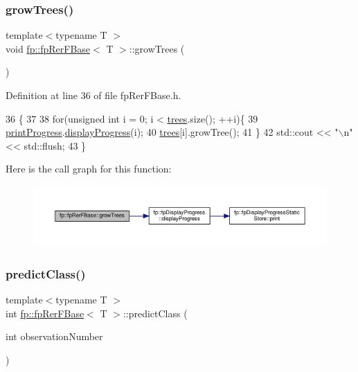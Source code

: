 \subsubsection{\texorpdfstring{grow\+Trees()}{growTrees()}}
{\footnotesize\ttfamily template$<$typename T $>$ \\
void \hyperlink{classfp_1_1fpRerFBase}{fp\+::fp\+Rer\+F\+Base}$<$ T $>$\+::grow\+Trees (\begin{DoxyParamCaption}{ }\end{DoxyParamCaption})\hspace{0.3cm}{\ttfamily [inline]}}



Definition at line 36 of file fp\+Rer\+F\+Base.\+h.


\begin{DoxyCode}
36                             \{
37 
38                 \textcolor{keywordflow}{for}(\textcolor{keywordtype}{unsigned} \textcolor{keywordtype}{int} i = 0; i < \hyperlink{classfp_1_1fpRerFBase_a6c2f12312e64e5234fc53741f1bfbe96}{trees}.size(); ++i)\{
39                     \hyperlink{classfp_1_1fpRerFBase_a539e79a960846182fc49420d79896ba1}{printProgress}.\hyperlink{classfp_1_1fpDisplayProgress_adf5b2e390618d63eccb6de3b00eb857b}{displayProgress}(i);
40                     \hyperlink{classfp_1_1fpRerFBase_a6c2f12312e64e5234fc53741f1bfbe96}{trees}[i].growTree();
41                 \}
42                 std::cout << \textcolor{stringliteral}{"\(\backslash\)n"}<< std::flush;
43             \}
\end{DoxyCode}
Here is the call graph for this function\+:
\nopagebreak
\begin{figure}[H]
\begin{center}
\leavevmode
\includegraphics[width=350pt]{classfp_1_1fpRerFBase_a5faf8bb9221d903880e0bd6660ea4d0d_cgraph}
\end{center}
\end{figure}
\mbox{\label{classfp_1_1fpRerFBase_a73ece66e774ad5f1a450f1422626947f}} 
\subsubsection{\texorpdfstring{predict\+Class()}{predictClass()}}
{\footnotesize\ttfamily template$<$typename T $>$ \\
int \hyperlink{classfp_1_1fpRerFBase}{fp\+::fp\+Rer\+F\+Base}$<$ T $>$\+::predict\+Class (\begin{DoxyParamCaption}\item[{int}]{observation\+Number }\end{DoxyParamCaption})\hspace{0.3cm}{\ttfamily [inline]}}



